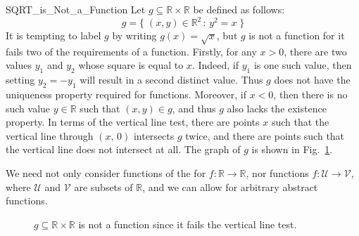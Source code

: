         \begin{lexample}{}{SQRT_is_Not_a_Function}
            Let $g\subseteq\mathbb{R}\times\mathbb{R}$ be defined as follows:
            \begin{equation}
                g=\big\{\;(x,y)\in\mathbb{R}^{2}\,:\,y^{2}=x\;\big\}
            \end{equation}
            It is tempting to label $g$ by writing $g(x)=\sqrt{x}$, but $g$ is
            not a function for it fails two of the requirements of a function.
            Firstly, for any $x>0$, there are two values $y_{1}$ and $y_{2}$
            whose square is equal to $x$. Indeed, if $y_{1}$ is one such value,
            then setting $y_{2}=\minus{y}_{1}$ will result in a second
            distinct value. Thus $g$ does not have the uniqueness property
            required for functions. Moreover, if $x<0$, then there is no such
            value $y\in\mathbb{R}$ such that $(x,y)\in{g}$, and thus $g$ also
            lacks the existence property. In terms of the vertical line test,
            there are points $x$ such that the vertical line through
            $(x,\,0)$ intersects $g$ twice, and there are points such that the
            vertical line does not intersect at all. The graph of $g$ is shown
            in Fig.~\ref{fig:SQRT_Not_a_Function}.
        \end{lexample}
        We need not only consider functions of the for
        $f:\mathbb{R}\rightarrow\mathbb{R}$, nor functions
        $f:\mathcal{U}\rightarrow\mathcal{V}$, where $\mathcal{U}$ and
        $\mathcal{V}$ are subsets of $\mathbb{R}$, and we can allow for
        arbitrary abstract functions.
        \begin{figure}[H]
            \centering
            
            \caption[Example of a Non-Function]
                {$g\subseteq\mathbb{R}\times\mathbb{R}$ is not a function
                 since it fails the vertical line test.}
            \label{fig:SQRT_Not_a_Function}
        \end{figure}
